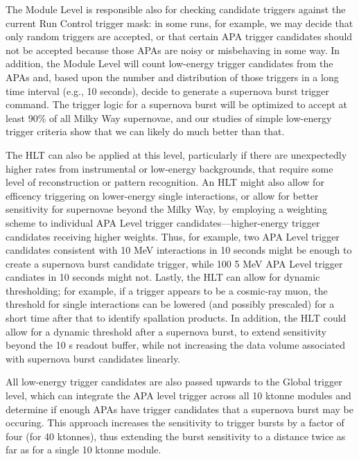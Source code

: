 	The Module Level is responsible also for checking candidate triggers
against the current Run Control trigger mask: in some runs, for example, we
may decide that only random triggers are accepted, or that certain APA trigger
candidates should not be accepted because those APAs are noisy or misbehaving
in some way.  In addition, the Module Level will count low-energy trigger
candidates from the APAs and, based upon the number and distribution of those
triggers in a long time interval (e.g., 10 seconds), decide to generate a
supernova burst trigger command. The trigger logic for a supernova burst will
be optimized to accept at least 90\% of all Milky Way supernovae, and our
studies of simple low-energy trigger criteria show that we can likely do much
better than that.  

	The HLT can also be applied at this level, particularly if there are
unexpectedly higher rates from instrumental or low-energy backgrounds, that
require some level of reconstruction or pattern recognition.  An HLT might also
allow for efficency triggering on lower-energy single interactions, or allow
for better sensitivity for supernovae beyond the Milky Way, by employing a
weighting scheme to individual APA Level trigger candidates---higher-energy
trigger candidates receiving higher weights. Thus, for example, two APA Level
trigger candidates consistent with 10 MeV interactions in 10 seconds might be
enough to create a supernova burst candidate trigger, while 100 5 MeV APA Level
trigger candiates in 10 seconds might not. Lastly, the HLT can allow for
dynamic thresholding; for example, if a trigger appears to be a cosmic-ray
muon, the threshold for single interactions can be lowered (and possibly
prescaled) for a short time after that to identify spallation products. In
addition, the HLT could allow for a dynamic threshold after a supernova burst,
to extend sensitivity beyond the 10 s readout buffer, while not increasing the
data volume associated with supernova burst candidates linearly. 

All low-energy trigger candidates are also passed upwards to the Global trigger
level, which can integrate the APA level trigger across all 10 ktonne modules
and determine if enough APAs have trigger candidates that a supernova burst may
be occuring. This approach increases the sensitivity to trigger bursts by a
factor of four (for 40 ktonnes), thus extending the burst sensitivity to a
distance twice as far as for a single 10 ktonne module. 

